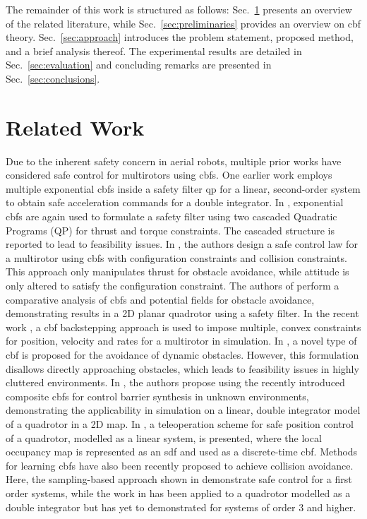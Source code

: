 The remainder of this work is structured as follows: Sec.~\ref{sec:relatedwork} presents an overview of the related literature, while Sec.~\ref{sec:preliminaries} provides an overview on \ac{cbf} theory. Sec.~\ref{sec:approach} introduces the problem statement, proposed method, and a brief analysis thereof. The experimental results are detailed in Sec.~\ref{sec:evaluation} and concluding remarks are presented in Sec.~\ref{sec:conclusions}.


\section{Related Work}\label{sec:relatedwork}

Due to the inherent safety concern in aerial robots, multiple prior works have considered safe control for multirotors using \acp{cbf}. One earlier work employs multiple exponential \acp{cbf} inside a safety filter \ac{qp} for a linear, second-order system to obtain safe acceleration commands for a double integrator. In \cite{cascaded_CBF}, exponential \acp{cbf} are again used to formulate a safety filter using two cascaded Quadratic Programs (QP) for thrust and torque constraints. The cascaded structure is reported to lead to feasibility issues. In \cite{range_sensing_CBF}, the authors design a safe control law for a multirotor using \acp{cbf} with configuration constraints and collision constraints. This approach only manipulates thrust for obstacle avoidance, while attitude is only altered to satisfy the configuration constraint.
The authors of \cite{cbf_potential_field_analysis} perform a comparative analysis of \acp{cbf} and potential fields for obstacle avoidance, demonstrating results in a 2D planar quadrotor using a safety filter.
In the recent work \cite{backstepping_CBF}, a \ac{cbf} backstepping approach is used to impose multiple, convex constraints for position, velocity and rates for a multirotor in simulation. In \cite{collisionConeCBF}, a novel type of \ac{cbf} is proposed for the avoidance of dynamic obstacles. However, this formulation disallows directly approaching obstacles, which leads to feasibility issues in highly cluttered environments.
In \cite{compositeCBFtemporal}, the authors propose using the recently introduced composite \acp{cbf} for control barrier synthesis in unknown environments, demonstrating the applicability in simulation on a linear, double integrator model of a quadrotor in a 2D map.
In \cite{CBF_aided_teleop}, a teleoperation scheme for safe position control of a quadrotor, modelled as a linear system, is presented, where the local occupancy map is represented as an \ac{sdf} and used as a discrete-time \ac{cbf}.
Methods for learning \acp{cbf} have also been recently proposed to achieve collision avoidance. Here, the sampling-based approach shown in \cite{dawson2022learning} demonstrate safe control for a first order systems, while the work in \cite{harms2024neural} has been applied to a quadrotor modelled as a double integrator but has yet to demonstrated for systems of order 3 and higher.

